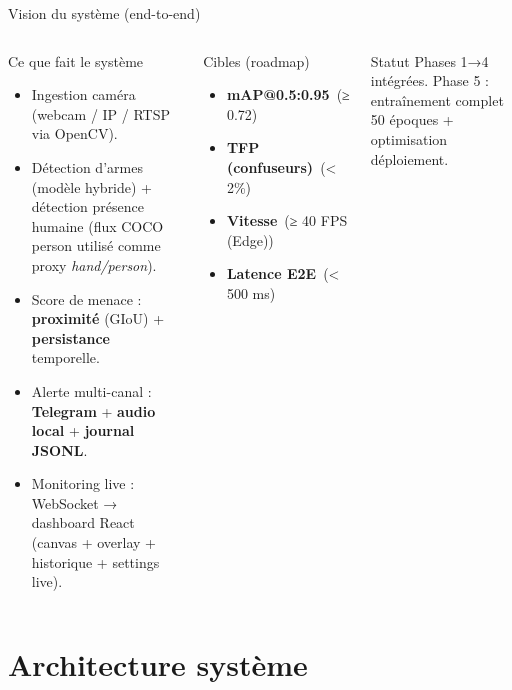 \documentclass[aspectratio=169,11pt]{beamer}
\newcommand{\kpi}[2]{\textbf{#1}~\textcolor{brandGray}{(#2)}}
\begin{document}
\begin{frame}{Vision du système (end-to-end)}
  \begin{columns}[T,onlytextwidth]
    \begin{block}{Ce que fait le système}
      \begin{itemize}
        \item Ingestion caméra (webcam / IP / RTSP via OpenCV).
        \item Détection d'armes (modèle hybride) + détection présence humaine (flux COCO person utilisé comme proxy \textit{hand/person}).
        \item Score de menace : \textbf{proximité} (GIoU) + \textbf{persistance} temporelle.
        \item Alerte multi-canal : \textbf{Telegram} + \textbf{audio local} + \textbf{journal JSONL}.
        \item Monitoring live : WebSocket → dashboard React (canvas + overlay + historique + settings live).
      \end{itemize}
    \end{block}

    \begin{block}{Cibles (roadmap)}
      \begin{itemize}
        \item \kpi{mAP@0.5:0.95}{≥ 0.72}
        \item \kpi{TFP (confuseurs)}{< 2\%}
        \item \kpi{Vitesse}{≥ 40 FPS (Edge)}
        \item \kpi{Latence E2E}{< 500 ms}
      \end{itemize}
    \end{block}

    \begin{alertblock}{Statut}
      Phases 1→4 intégrées. \newline
      Phase 5 : entraînement complet 50 époques + optimisation déploiement.
    \end{alertblock}
  \end{columns}
\end{frame}

\section{Architecture système}
\end{document}

